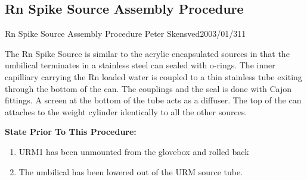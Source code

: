 \clearpage

\subsection{Rn Spike Source Assembly Procedure}
             {Rn Spike Source Assembly Procedure}
             {Peter Skensved}{2003/01/31}{1}

  The Rn Spike Source is similar to the acrylic encapsulated sources in that
the umbilical terminates in a stainless steel can sealed with o-rings.
The inner capilliary carrying the Rn loaded water is coupled to a thin
stainless tube exiting through the bottom of the can. The couplings and the
seal is done with Cajon fittings. A screen at the bottom of the tube acts
as a diffuser. The top of the can attaches to the weight cylinder identically
to all the other sources.




\noindent
{\bf State Prior To This Procedure:}
\begin{enumerate}
\item URM1 has been unmounted from the glovebox and rolled back
\item The umbilical has been lowered out of the URM source tube.
\end{enumerate}




